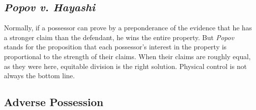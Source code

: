 \subsection{\emph{Popov v. Hayashi}} 

Normally, if a possessor can prove by a preponderance of the evidence that he 
has a stronger claim than the defendant, he wins the entire property. But 
\emph{Popov} stands for the proposition that each possessor's interest in the 
property is proportional to the strength of their claims. When their claims are 
roughly equal, as they were here, equitable division is the right solution. 
Physical control is not always the bottom line.

\subsection{Adverse Possession}

